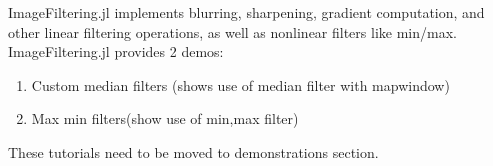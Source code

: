 \vspace{0.5cm}
\large
ImageFiltering.jl implements blurring, sharpening, gradient computation, and other linear filtering operations, as well as nonlinear filters like min/max.
ImageFiltering.jl provides 2 demos:
\begin{enumerate}
    \item Custom median filters (shows use of median filter with mapwindow)
    \item Max min filters(show use of min,max filter)
\end{enumerate}

These tutorials need to be moved to demonstrations section.






